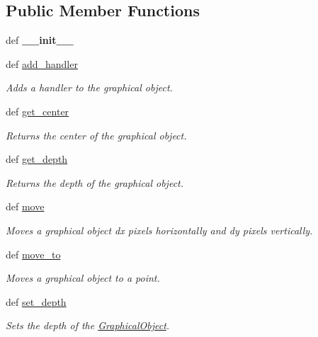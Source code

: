 \subsection*{Public Member Functions}
\begin{DoxyCompactItemize}
\item 
\hypertarget{classbroken__cs110graphics_1_1GraphicalObject_a8440e709e623bed54fa284625d076cba}{
def {\bfseries \_\-\_\-init\_\-\_\-}}
\label{classbroken__cs110graphics_1_1GraphicalObject_a8440e709e623bed54fa284625d076cba}

\item 
def \hyperlink{classbroken__cs110graphics_1_1GraphicalObject_af1f0593829e2355a58fe6e60f56e1046}{add\_\-handler}
\begin{DoxyCompactList}\small\item\em Adds a handler to the graphical object. \item\end{DoxyCompactList}\item 
def \hyperlink{classbroken__cs110graphics_1_1GraphicalObject_a48a1651bf6d7bf7bb2a24ed61082df66}{get\_\-center}
\begin{DoxyCompactList}\small\item\em Returns the center of the graphical object. \item\end{DoxyCompactList}\item 
def \hyperlink{classbroken__cs110graphics_1_1GraphicalObject_a308b73d50adab0e04c16dc65dd9225d9}{get\_\-depth}
\begin{DoxyCompactList}\small\item\em Returns the depth of the graphical object. \item\end{DoxyCompactList}\item 
def \hyperlink{classbroken__cs110graphics_1_1GraphicalObject_aebbdd098df38319fa08db41caad93282}{move}
\begin{DoxyCompactList}\small\item\em Moves a graphical object dx pixels horizontally and dy pixels vertically. \item\end{DoxyCompactList}\item 
def \hyperlink{classbroken__cs110graphics_1_1GraphicalObject_ad41f02c6b8a874f21ca63bcb6a0320c5}{move\_\-to}
\begin{DoxyCompactList}\small\item\em Moves a graphical object to a point. \item\end{DoxyCompactList}\item 
def \hyperlink{classbroken__cs110graphics_1_1GraphicalObject_a44da58c2cea9721452c03b460d978ab6}{set\_\-depth}
\begin{DoxyCompactList}\small\item\em Sets the depth of the \hyperlink{classbroken__cs110graphics_1_1GraphicalObject}{GraphicalObject}. \item\end{DoxyCompactList}\end{DoxyCompactItemize}


